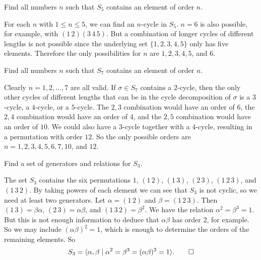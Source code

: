  Find all numbers $n$ such that $S_5$ contains an element
of order $n$.
\begin{solution}
  For each $n$ with $1\leq n\leq5$, we can find an $n$-cycle in
  $S_5$. $n=6$ is also possible, for example, with
  $(1\,2)(3\,4\,5)$. But a combination of longer cycles of different
  lengths is not possible since the underlying set $\{1,2,3,4,5\}$
  only has five elements. Therefore the only possibilities for $n$ are
  $1,2,3,4,5$, and $6$.
\end{solution}

 Find all numbers $n$ such that $S_7$ contains an element
of order $n$.
\begin{solution}
  Clearly $n = 1, 2, \dots, 7$ are all valid. If $\sigma\in S_7$
  contains a $2$-cycle, then the only other cycles of different
  lengths that can be in the cycle decomposition of $\sigma$ is a
  $3$-cycle, a $4$-cycle, or a $5$-cycle. The $2,3$ combination would
  have an order of $6$, the $2,4$ combination would have an order of
  $4$, and the $2,5$ combination would have an order of $10$. We could
  also have a $3$-cycle together with a $4$-cycle, resulting in a
  permutation with order $12$. So the only possible orders are
  $n = 1,2,3,4,5,6,7,10$, and $12$.
\end{solution}

 Find a set of generators and relations for $S_3$.
\begin{solution}
  The set $S_3$ contains the six permutations $1$, $(1\,2)$, $(1\,3)$,
  $(2\,3)$, $(1\,2\,3)$, and $(1\,3\,2)$. By taking powers of each
  element we can see that $S_3$ is not cyclic, so we need at least two
  generators. Let $\alpha = (1\,2)$ and $\beta = (1\,2\,3)$. Then
  $(1\,3) = \beta\alpha$, $(2\,3) = \alpha\beta$, and
  $(1\,3\,2) = \beta^2$. We have the relation
  $\alpha^2 = \beta^3 = 1$. But this is not enough information to
  deduce that $\alpha\beta$ has order $2$, for example. So we may
  include $(\alpha\beta)^2 = 1$, which is enough to determine the
  orders of the remaining elements. So
  \begin{equation*}
    S_3 = \langle{\alpha,\beta
      \mid \alpha^2 = \beta^3 = (\alpha\beta)^2 = 1}\rangle. \qedhere
  \end{equation*}
\end{solution}
